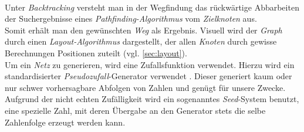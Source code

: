 \documentclass[12pt]{article}
\begin{document}
\\
Unter \textit{Backtracking} versteht man in der Wegfindung das rückwärtige Abbarbeiten der Suchergebnisse eines \textit{Pathfinding-Algorithmus} vom \textit{Zielknoten} aus. 
\\
Somit erhält man den gewünschten \textit{Weg} als Ergebnis. Visuell wird der \textit{Graph} durch einen \textit{Layout-Algorithmus} dargestellt, der allen \textit{Knoten} durch gewisse Berechnungen Positionen zuteilt (vgl. \autoref{sec:layout}).
\\
Um ein \textit{Netz} zu generieren, wird eine Zufallsfunktion verwendet. Hierzu wird ein standardisierter \textit{Pseudozufall}-Generator verwendet \cite{random}. Dieser generiert kaum oder nur schwer vorhersagbare Abfolgen von Zahlen und genügt für unsere Zwecke. Aufgrund der nicht echten Zufälligkeit wird ein sogenanntes \textit{Seed}-System benutzt, eine spezielle Zahl, mit deren Übergabe an den Generator stets die selbe Zahlenfolge erzeugt werden kann.
\end{document}

